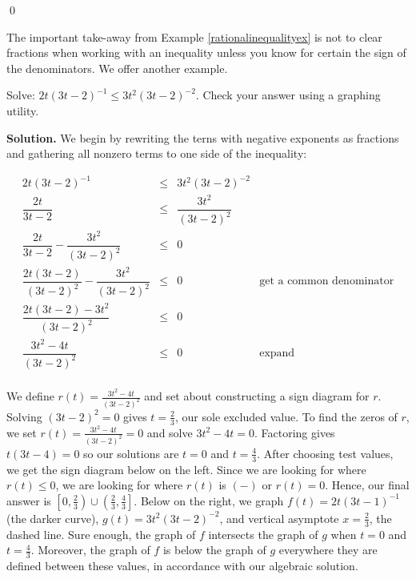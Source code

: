 \begin{ex}
\begin{enumerate}
\begin{center}
\begin{tabular}{cc}
\end{tabular}

\end{center} 

 \qed

\end{enumerate}
\end{ex}  

The important take-away from Example \ref{rationalinequalityex} is not to clear fractions when working with an inequality unless you know for certain the sign of the denominators. We offer another example.

\begin{ex} \label{morerationalineq} Solve:  $2t (3t-2)^{-1} \leq 3t^2 (3t-2)^{-2}$. Check your answer using a graphing utility.


{\bf Solution.} We begin by rewriting the terns with negative exponents as fractions and gathering all nonzero terms to one side of the inequality:

\[ \begin{array}{rclr}

2t (3t-2)^{-1} &  \leq & 3t^2 (3t-2)^{-2} & \\ [10pt]

\dfrac{2t}{3t-2} & \leq & \dfrac{3t^2}{(3t-2)^2} & \\ [10pt]


\dfrac{2t}{3t-2}  - \dfrac{3t^2}{(3t-2)^2}  & \leq & 0 &  \\ [10pt]

\dfrac{2t(3t-2)}{(3t-2)^2}  - \dfrac{3t^2}{(3t-2)^2}  & \leq & 0  & \text{get a common denominator} \\ [10pt]

\dfrac{2t(3t-2) - 3t^2}{(3t-2)^2}  & \leq & 0  &\\ [10pt]

\dfrac{3t^2-4t}{(3t-2)^2}  & \leq & 0  & \text{expand} \\ [10pt]

\end{array} \]

We define $r(t) = \frac{3t^2-4t}{(3t-2)^2}$ and set about constructing a sign diagram for $r$.  Solving  $(3t-2)^2 = 0$ gives $t = \frac{2}{3}$, our sole excluded value.  To find the zeros of $r$, we set $r(t) = \frac{3t^2-4t}{(3t-2)^2} = 0$ and solve $3t^2-4t = 0$.  Factoring gives $t(3t-4) = 0$ so our solutions are $t = 0$ and $t = \frac{4}{3}$. After choosing test values, we  get the sign diagram below on the left.   Since we are looking for where $r(t) \leq 0$, we are looking for where $r(t)$ is $(-)$ or $r(t) = 0$. Hence,  our final answer is $\left[0, \frac{2}{3} \right) \cup \left(\frac{2}{3}, \frac{4}{3} \right]$.  Below on the right,  we graph $f(t) = 2t(3t-1)^{-1}$ (the darker curve),   $g(t) = 3t^2(3t-2)^{-2}$, and  vertical asymptote $x = \frac{2}{3}$, the dashed line.  Sure enough, the graph of $f$ intersects the graph of $g$ when $t = 0$ and $t = \frac{4}{3}$.  Moreover, the graph of $f$ is below the graph of $g$ everywhere they are defined between these values, in accordance with our algebraic solution.


\end{ex}
